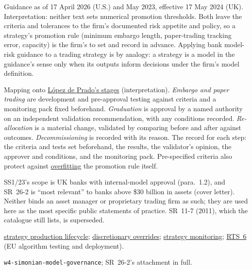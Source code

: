 \begin{qfmethod}
 Guidance as of 17 April 2026 (U.S.) and May 2023, effective 17 May 2024 (UK). Interpretation: neither text sets numerical promotion thresholds. Both leave the criteria and tolerances to the firm's documented risk appetite and policy, so a strategy's promotion rule (minimum embargo length, paper-trading tracking error, capacity) is the firm's to set and record in advance. Applying bank model-risk guidance to a trading strategy is by analogy: a strategy is a model in the guidance's sense only when its outputs inform decisions under the firm's model definition.

 Mapping onto \hyperref[meth:strategy-production-lifecycle]{López de Prado's stages} (interpretation). \emph{Embargo and paper trading} are development and pre-approval testing against criteria and a monitoring pack fixed beforehand. \emph{Graduation} is approval by a named authority on an independent validation recommendation, with any conditions recorded. \emph{Re-allocation} is a material change, validated by comparing before and after against outcomes. \emph{Decommissioning} is recorded with its reason. The record for each step: the criteria and tests set beforehand, the results, the validator's opinion, the approver and conditions, and the monitoring pack. Pre-specified criteria also protect against \hyperref[pit:parameter-overfitting]{overfitting} the promotion rule itself.

 SS1/23's scope is UK banks with internal-model approval (para.~1.2), and SR~26-2 is ``most relevant'' to banks above \$30 billion in assets (cover letter). Neither binds an asset manager or proprietary trading firm as such; they are used here as the most specific public statements of practice. SR~11-7 (2011), which the catalogue still lists, is superseded.

 \hyperref[meth:strategy-production-lifecycle]{strategy production lifecycle}; \hyperref[meth:discretionary-override-governance]{discretionary overrides}; \hyperref[meth:quant-strategy-monitoring]{strategy monitoring}; \hyperref[rule:mifid-rts6-algorithmic-controls]{RTS~6} (EU algorithm testing and deployment).

 \nolinkurl{w4-simonian-model-governance}; SR~26-2's attachment in full.

\end{qfmethod}

